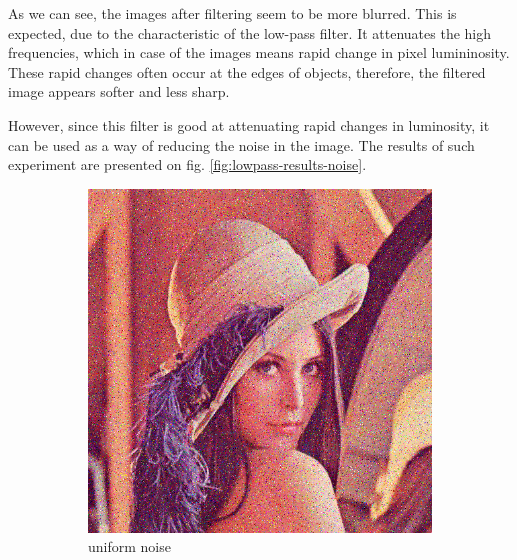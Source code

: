 \documentclass[12pt]{article}
\begin{document}
As we can see, the images after filtering seem to be more blurred.
This is expected, due to the characteristic of the low-pass filter.
It attenuates the high frequencies, which in case of the images means rapid change in pixel lumininosity.
These rapid changes often occur at the edges of objects, therefore, the filtered image appears softer and less sharp.

However, since this filter is good at attenuating rapid changes in luminosity, it can be used as a way of reducing the noise in the image.
The results of such experiment are presented on fig. \ref{fig:lowpass-results-noise}.

\begin{figure}[h]\centering
    \begin{subfigure}[t]{\subfiguresize}
        \includegraphics[width=\textwidth]{lenac_uniform3.png}
        \caption{uniform noise}
    \end{subfigure}
    \begin{subfigure}[t]{\subfiguresize}

\end{subfigure}
\end{figure}
\end{document}

